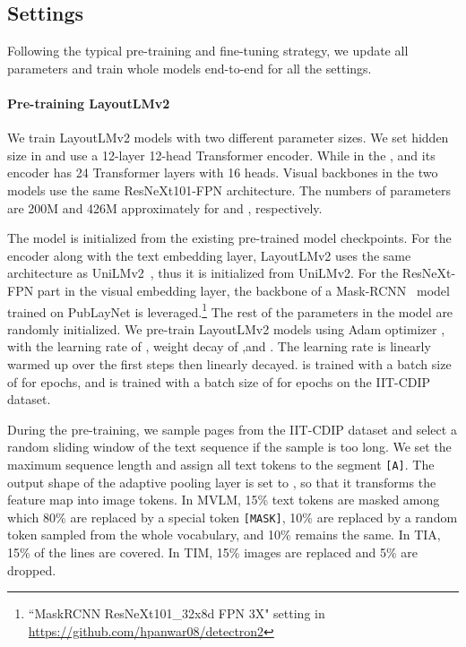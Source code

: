 \documentclass{article} \usepackage{iclr2021_conference,times}
\begin{document}
\subsection{Settings}
\label{sec:Experiments.Settings}

Following the typical pre-training and fine-tuning strategy, we update all parameters and train whole models end-to-end for all the settings.


\paragraph{Pre-training LayoutLMv2}

We train LayoutLMv2 models with two different parameter sizes. We set hidden size  in  and use a 12-layer 12-head Transformer encoder. While in the ,  and its encoder has 24 Transformer layers with 16 heads. Visual backbones in the two models use the same ResNeXt101-FPN architecture. The numbers of parameters are 200M and 426M approximately for  and , respectively.

The model is initialized from the existing pre-trained model checkpoints. For the encoder along with the text embedding layer, LayoutLMv2 uses the same architecture as UniLMv2~\citep{bao2020unilmv2}, thus it is initialized from UniLMv2. For the ResNeXt-FPN part in the visual embedding layer, the backbone of a Mask-RCNN~\citep{He_2017_ICCV} model trained on PubLayNet \citep{zhong2019publaynet} is leveraged.\footnote{\scriptsize ``MaskRCNN ResNeXt101\_32x8d FPN 3X" setting in \url{https://github.com/hpanwar08/detectron2}} The rest of the parameters in the model are randomly initialized. We pre-train LayoutLMv2 models using Adam optimizer \citep{kingma2017adam,loshchilov2018decoupled}, with the learning rate of , weight decay of ,and . The learning rate is linearly warmed up over the first  steps then linearly decayed.  is trained with a batch size of  for  epochs, and  is trained with a batch size of  for  epochs on the IIT-CDIP dataset.

During the pre-training, we sample pages from the IIT-CDIP dataset and select a random sliding window of the text sequence if the sample is too long. We set the maximum sequence length  and assign all text tokens to the segment {\tt[A]}. The output shape of the adaptive pooling layer is set to , so that it transforms the feature map into  image tokens. In MVLM, 15\% text tokens are masked among which 80\% are replaced by a special token {\tt[MASK]}, 10\% are replaced by a random token sampled from the whole vocabulary, and 10\% remains the same. In TIA, 15\% of the lines are covered. In TIM, 15\% images are replaced and 5\% are dropped.
\end{document}
